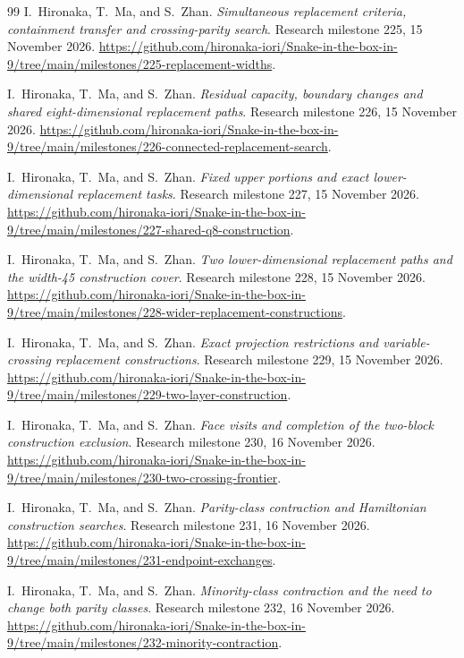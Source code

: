 \documentclass[11pt,a4paper]{article}
\theoremstyle{definition}
\theoremstyle{remark}
\begin{document}
\begin{thebibliography}{99}
I.~Hironaka, T.~Ma, and S.~Zhan. \emph{Simultaneous replacement criteria,
containment transfer and crossing-parity search}. Research milestone 225,
15 November 2026.
\url{https://github.com/hironaka-iori/Snake-in-the-box-in-9/tree/main/milestones/225-replacement-widths}.

I.~Hironaka, T.~Ma, and S.~Zhan. \emph{Residual capacity, boundary changes
and shared eight-dimensional replacement paths}. Research milestone 226,
15 November 2026.
\url{https://github.com/hironaka-iori/Snake-in-the-box-in-9/tree/main/milestones/226-connected-replacement-search}.

I.~Hironaka, T.~Ma, and S.~Zhan. \emph{Fixed upper portions and exact
lower-dimensional replacement tasks}. Research milestone 227,
15 November 2026.
\url{https://github.com/hironaka-iori/Snake-in-the-box-in-9/tree/main/milestones/227-shared-q8-construction}.

I.~Hironaka, T.~Ma, and S.~Zhan. \emph{Two lower-dimensional replacement
paths and the width-45 construction cover}. Research milestone 228,
15 November 2026.
\url{https://github.com/hironaka-iori/Snake-in-the-box-in-9/tree/main/milestones/228-wider-replacement-constructions}.

I.~Hironaka, T.~Ma, and S.~Zhan. \emph{Exact projection restrictions and
variable-crossing replacement constructions}. Research milestone 229,
15 November 2026.
\url{https://github.com/hironaka-iori/Snake-in-the-box-in-9/tree/main/milestones/229-two-layer-construction}.

I.~Hironaka, T.~Ma, and S.~Zhan. \emph{Face visits and completion of the
two-block construction exclusion}. Research milestone 230,
16 November 2026.
\url{https://github.com/hironaka-iori/Snake-in-the-box-in-9/tree/main/milestones/230-two-crossing-frontier}.

I.~Hironaka, T.~Ma, and S.~Zhan. \emph{Parity-class contraction and
Hamiltonian construction searches}. Research milestone 231,
16 November 2026.
\url{https://github.com/hironaka-iori/Snake-in-the-box-in-9/tree/main/milestones/231-endpoint-exchanges}.

I.~Hironaka, T.~Ma, and S.~Zhan. \emph{Minority-class contraction and
the need to change both parity classes}. Research milestone 232,
16 November 2026.
\url{https://github.com/hironaka-iori/Snake-in-the-box-in-9/tree/main/milestones/232-minority-contraction}.


\end{thebibliography}
\end{document}
